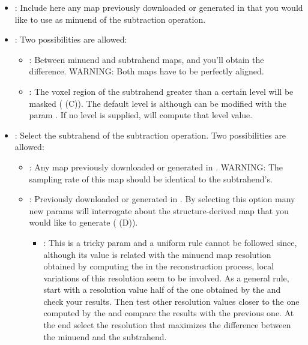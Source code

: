 \begin{itemize}
            \begin{itemize}
            \item {}: Include here any map previously downloaded or generated in \scipion that you would like to use as minuend of the subtraction operation.
            \item {}: Two possibilities are allowed:
                \begin{itemize}
                        \item {}: Between minuend and subtrahend maps, and you'll obtain the difference. WARNING: Both maps have to be perfectly aligned.
                        \item {}: The voxel region of the subtrahend greater than a certain level will be masked ( (C)). The default level is  although can be modified with the  param . If no level is supplied, \chimera will compute that level value.
                \end{itemize}
            \item {}: Select the subtrahend of the subtraction operation. Two possibilities are allowed:
                    \begin{itemize}
                        \item {}: Any map previously downloaded or generated in \scipion. WARNING: The sampling rate of this map should be identical to the subtrahend's.
                        \item {}: Previously downloaded or generated in \scipion. By selecting this option many new params will interrogate about the structure-derived map that you would like to generate ( (D)).
                                \begin{itemize}
                                \item {}: This is a tricky param and a uniform rule cannot be followed since, although its value is related with the minuend map resolution obtained by computing the  in the reconstruction process, local variations of this resolution seem to be involved. As a general rule, start with a resolution value half of the one obtained by the  and check your results. Then test other resolution values closer to the one computed by the  and compare the results with the previous one. At the end select the resolution that maximizes the difference between the minuend and the subtrahend.

\end{itemize}
\end{itemize}
\end{itemize}
\end{itemize}
